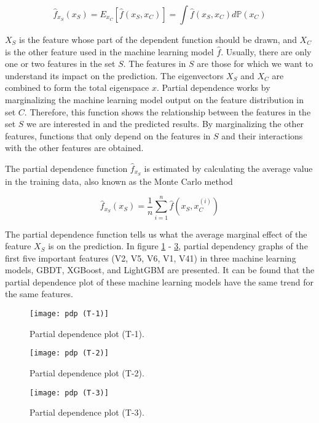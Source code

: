 \documentclass[review]{elsarticle}
\begin{document}
\begin{equation} \label{equ_9}
    \hat{f}_{x_{S}}\left(x_{S}\right)=E_{x_{C}}\left[\hat{f}\left(x_{S}, x_{C}\right)\right]=\int \hat{f}\left(x_{S}, x_{C}\right) d \mathbb{P}\left(x_{C}\right)
\end{equation}

$X_{S}$ is the feature whose part of the dependent function should be drawn, and $X_{C}$ is the other feature used in the machine learning model $\hat{f}$. Usually, there are only one or two features in the set $S$. The features in $S$ are those for which we want to understand its impact on the prediction. The eigenvectors $X_{S}$ and $X_{C}$ are combined to form the total eigenspace $x$. Partial dependence works by marginalizing the machine learning model output on the feature distribution in set $C$. Therefore, this function shows the relationship between the features in the set $S$ we are interested in and the predicted results. By marginalizing the other features, functions that only depend on the features in $S$ and their interactions with the other features are obtained.

The partial dependence function $\hat{f}_{x_{S}}$ is estimated by calculating the average value in the training data, also known as the Monte Carlo method

\begin{equation} \label{equ_10}
    \hat{f}_{x_{S}}\left(x_{S}\right)=\frac{1}{n} \sum_{i=1}^{n} \hat{f}\left(x_{S}, x_{C}^{(i)}\right)
\end{equation}

The partial dependence function tells us what the average marginal effect of the feature $X_{S}$ is on the prediction. In figure \ref{fig: pdp 1} - \ref{fig: pdp 3}, partial dependency graphs of the first five important features (V2, V5, V6, V1, V41) in three machine learning models, GBDT, XGBoost, and LightGBM are presented. It can be found that the partial dependence plot of these machine learning models have the same trend for the same features.

\begin{figure}[H]
    \centering
    \texttt{[image: pdp (T-1)]}
    \caption{Partial dependence plot (T-1).}
    \label{fig: pdp 1}
\end{figure}
\begin{figure}[H]
    \centering
    \texttt{[image: pdp (T-2)]}
    \caption{Partial dependence plot (T-2).}
    \label{fig: pdp 2}
\end{figure}
\begin{figure}[H]
    \centering
    \texttt{[image: pdp (T-3)]}
    \caption{Partial dependence plot (T-3).}
    \label{fig: pdp 3}
\end{figure}
\end{document}

